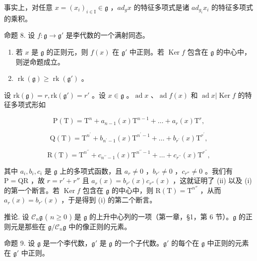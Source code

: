事实上，对任意 \(x = (x_{i})_{i \in \mathrm{I}} \in \mathfrak{g}\) ，\(ad_{g}x\) 的特征多项式是诸 \(ad_{g_{i}}x_{i}\) 的特征多项式的乘积。

命题 8. 设 \(f: \mathfrak{g} \to \mathfrak{g}'\) 是李代数的一个满射同态。

\begin{enumerate}
\def\labelenumi{(\roman{enumi})}
\item
  若 \(x\) 是 \(\mathfrak{g}\) 的正则元，则 \(f(x)\) 在 \(\mathfrak{g}'\) 中正则。若 \(\operatorname{Ker} f\) 包含在 \(\mathfrak{g}\) 的中心中，则逆命题成立。
\item
  \(\operatorname{rk}(\mathfrak{g}) \geq \operatorname{rk}(\mathfrak{g}')\) 。
\end{enumerate}

设 \(\mathrm{rk}(\mathfrak{g}) = r, \mathrm{rk}(\mathfrak{g}') = r'\) 。设 \(x \in \mathfrak{g}\) 。\(\operatorname{ad} x\) 、\(\operatorname{ad} f(x)\) 和 \(\operatorname{ad} x|\operatorname{Ker} f\) 的特征多项式形如

\[
\mathrm{P} (\mathrm{T}) = \mathrm{T} ^ {n} + a _ {n - 1} (x) \mathrm{T} ^ {n - 1} + \dots + a _ {r} (x) \mathrm{T} ^ {r},
\]

\[
\mathrm{Q} (\mathrm{T}) = \mathrm{T} ^ {n ^ {\prime}} + b _ {n ^ {\prime} - 1} (x) \mathrm{T} ^ {n ^ {\prime} - 1} + \dots + b _ {r ^ {\prime}} (x) \mathrm{T} ^ {r ^ {\prime}},
\]

\[
\mathrm{R} (\mathrm{T}) = \mathrm{T} ^ {n ^ {\prime \prime}} + c _ {n ^ {\prime \prime} - 1} (x) \mathrm{T} ^ {n ^ {\prime \prime} - 1} + \dots + c _ {r ^ {\prime \prime}} (x) \mathrm{T} ^ {r ^ {\prime \prime}},
\]

其中 \(a_i, b_i, c_i\) 是 \(\mathfrak{g}\) 上的多项式函数，且 \(a_r \neq 0\) ，\(b_{r'} \neq 0\) ，\(c_{r''} \neq 0\) 。我们有 \(\mathrm{P} = \mathrm{QR}\) ，故 \(r = r' + r''\) 且 \(a_r(x) = b_{r'}(x)c_{r''}(x)\) ，这就证明了 (ii) 以及 (i) 的第一个断言。若 \(\operatorname{Ker} f\) 包含在 \(\mathfrak{g}\) 的中心中，则 \(\mathrm{R(T)} = \mathrm{T}^{n''}\) ，从而 \(a_r(x) = b_{r'}(x)\) ，于是得到 (i) 的第二个断言。

推论. 设 \(\mathcal{C}_n\mathfrak{g}\) ( \(n \geq 0\) ) 是 \(\mathfrak{g}\) 的上升中心列的一项（第一章，§1，第 6 节）。\(\mathfrak{g}\) 的正则元是那些在 \(\mathfrak{g}/\mathcal{C}_n\mathfrak{g}\) 中的像正则的元素。

命题 9. 设 \(\mathfrak{g}\) 是一个李代数，\(\mathfrak{g}'\) 是 \(\mathfrak{g}\) 的一个子代数。\(\mathfrak{g}'\) 的每个在 \(\mathfrak{g}\) 中正则的元素在 \(\mathfrak{g}'\) 中正则。

